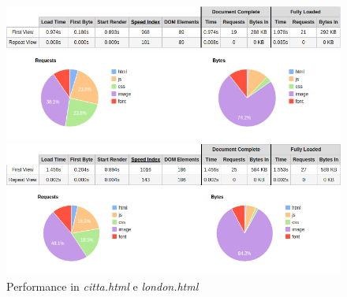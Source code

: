 \begin{figure}[h]
\begin{minipage}{0.45\textwidth}
\includegraphics[width=\linewidth]{images/performance/webpagetest/citta.png}
\end{minipage}
\hspace{\fill}
\vspace*{0.5cm}
\begin{minipage}{0.45\textwidth}

\includegraphics[width=\linewidth]{images/performance/webpagetest/citta-graph.png}
\end{minipage}

\begin{minipage}{0.45\textwidth}
\vspace*{0.5cm}
\includegraphics[width=\linewidth]{images/performance/webpagetest/london.png}
\end{minipage}
\hspace{\fill}
\vspace*{0.5cm}
\begin{minipage}{0.45\textwidth}

\includegraphics[width=\linewidth]{images/performance/webpagetest/london-graph.png}
\end{minipage}
\caption{Performance in \textit{citta.html} e \textit{london.html}}\label{multiavp}
\end{figure}
